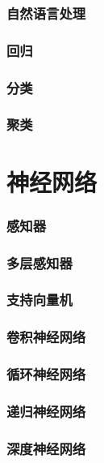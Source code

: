 \documentclass[UTF8]{ctexart}
\newcommand{\sectionbreak}{\clearpage}
\begin{document}
\section{自然语言处理}
\sectionbreak

\section{回归}
\sectionbreak 

\section{分类}
\sectionbreak 


\section{聚类}
\sectionbreak 



\part{神经网络}

\section{感知器}
\sectionbreak

\section{多层感知器}
\sectionbreak

\section{支持向量机}
\sectionbreak


\section{卷积神经网络}
\sectionbreak 

\section{循环神经网络}

\section{递归神经网络}
\sectionbreak

\section{深度神经网络}
\sectionbreak
\end{document}
